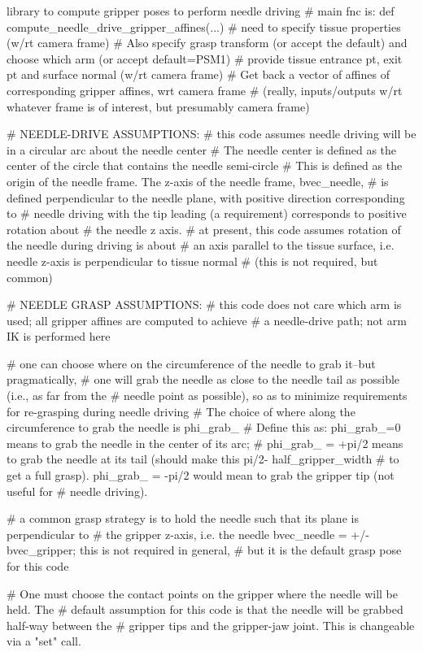 \begin{DoxyVerb}library to compute gripper poses to perform needle driving
# main fnc is: def compute_needle_drive_gripper_affines(...)
# need to specify tissue properties (w/rt camera frame)
# Also specify grasp transform (or accept the default) and choose which arm (or accept default=PSM1)
# provide tissue entrance pt, exit pt and surface normal (w/rt camera frame)
# Get back a vector of affines of corresponding gripper affines, wrt camera frame
# (really, inputs/outputs w/rt whatever frame is of interest, but presumably camera frame)


# NEEDLE-DRIVE ASSUMPTIONS:  
# this code assumes needle driving will be in a circular arc about the needle center
# The needle center is defined as the center of the circle that contains the needle semi-circle
#  This is defined as the origin of the needle frame. The z-axis of the needle frame, bvec_needle,
# is defined perpendicular to the needle plane, with positive direction corresponding to
# needle driving with the tip leading (a requirement) corresponds to positive rotation about
# the needle z axis.
# at present, this code assumes rotation of the needle during driving is about 
# an axis parallel to the tissue surface, i.e. needle z-axis is perpendicular to tissue normal
#  (this is not required, but common)

# NEEDLE GRASP ASSUMPTIONS:
# this code does not care which arm is used; all gripper affines are computed to achieve
# a needle-drive path; not arm IK is performed here

# one can choose where on the circumference of the needle to grab it--but pragmatically,
# one will grab the needle as close to the needle tail as possible (i.e., as far from the 
# needle point as possible), so as to minimize requirements for re-grasping during needle driving
# The choice of where along the circumference to grab the needle is phi_grab_
# Define this as: phi_grab_=0 means to grab the needle in the center of its arc;
# phi_grab_ = +pi/2 means to grab the needle at its tail (should make this pi/2- half_gripper_width
#   to get a full grasp).  phi_grab_ = -pi/2 would mean to grab the gripper tip (not useful for
#  needle driving).

# a common grasp strategy is to hold the needle such that its plane is perpendicular to
# the gripper z-axis, i.e. the needle bvec_needle = +/- bvec_gripper; this is not required in general,
# but it is the default grasp pose for this code

# One must choose the contact points on the gripper where the needle will be held.  The
# default assumption for this code is that the needle will be grabbed half-way between the
# gripper tips and the gripper-jaw joint.  This is changeable via a "set" call.


\end{DoxyVerb}
